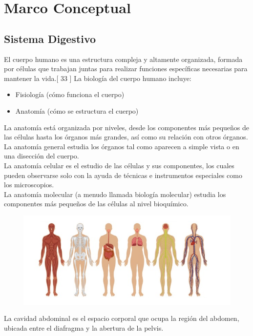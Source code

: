 \chapter{Marco Conceptual}

\section{Sistema Digestivo}
El cuerpo humano es una estructura compleja y altamente organizada, formada por células que trabajan juntas para realizar funciones específicas necesarias 
para mantener la vida.[ 33 ] La biología del cuerpo humano incluye:
\begin{itemize}
	\item Fisiología (cómo funciona el cuerpo)
	\item Anatomía (cómo se estructura el cuerpo)	
\end{itemize}
La anatomía está organizada por niveles, desde los componentes más pequeños de las células hasta los órganos más grandes, así como su relación con otros órganos.\\
La anatomía general estudia los órganos tal como aparecen a simple vista o en una disección del cuerpo.\\
La anatomía celular es el estudio de las células y sus componentes, los cuales pueden observarse solo con la ayuda de técnicas e instrumentos especiales como los microscopios.\\
La anatomía molecular (a menudo llamada biología molecular) estudia los componentes más pequeños de las células al nivel bioquímico.\\
\begin{figure}[H]
	\begin{center}
 		\includegraphics[width = .7\textwidth]{source/images/image22.png}
	\end{center} 
\end{figure}
La cavidad abdominal es el espacio corporal que ocupa la región del abdomen, ubicada entre el diafragma y la abertura de la pelvis. 
